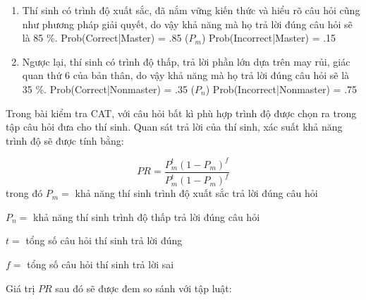 \begin{enumerate}
	\item Thí sinh có trình độ xuất sắc, đã nắm vững kiến thức và hiểu rõ câu hỏi cũng như phương pháp giải quyết, do vậy khả năng mà họ trả lời đúng câu hỏi sẽ là 85 \%. 
		\subitem Prob(Correct|Master) = .85 ($P_m$)
		\subitem Prob(Incorrect|Master) = .15
	\item Ngược lại, thí sinh có trình độ thấp, trả lời phần lớn dựa trên may rủi, giác quan thứ 6 của bản thân, do vậy khả năng mà họ trả lời đúng câu hỏi sẽ là 35 \%. 
		\subitem Prob(Correct|Nonmaster) = .35 ($P_n$)
		\subitem Prob(Incorrect|Nonmaster) = .75
\end{enumerate}  

Trong bài kiểm tra CAT, với câu hỏi bất kì phù hợp trình độ được chọn ra trong tập câu hỏi đưa cho thí sinh. Quan sát trả lời của thí sinh, xác suất khả năng trình độ sẽ được tính bằng:

\begin{equation}
PR = \dfrac{P_m^t(1-P_m)^f}{P_m^t(1-P_m)^f}
\end{equation}
trong đó $P_m = $ khả năng thí sinh trình độ xuất sắc trả lời đúng câu hỏi

$P_n = $ khả năng thí sinh trình độ thấp trả lời đúng câu hỏi

$t = $ tổng số câu hỏi thí sinh trả lời đúng 

$f = $ tổng số câu hỏi thí sinh trả lời sai 

Giá trị $PR$ sau đó sẽ được đem so sánh với tập luật:

\begin{center}
\end{center}

